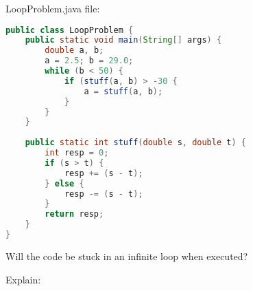 \documentclass[9pt]{article}
\begin{document}
\begin{multicols}{2}
LoopProblem.java file:
\begin{lstlisting}[language=Java]
public class LoopProblem {
	public static void main(String[] args) {
		double a, b;
		a = 2.5; b = 29.0;
		while (b < 50) {
			if (stuff(a, b) > -30 {
				a = stuff(a, b);
			}
		}
	}
	
	public static int stuff(double s, double t) {
		int resp = 0;
		if (s > t) {
			resp += (s - t);
		} else {
			resp -= (s - t);
		}
		return resp;
	}
}
\end{lstlisting}

\vfill
\columnbreak
Will the code be stuck in an infinite loop when executed?
\hfill\vspace{5mm}

Explain:

\end{multicols}
\end{document}
